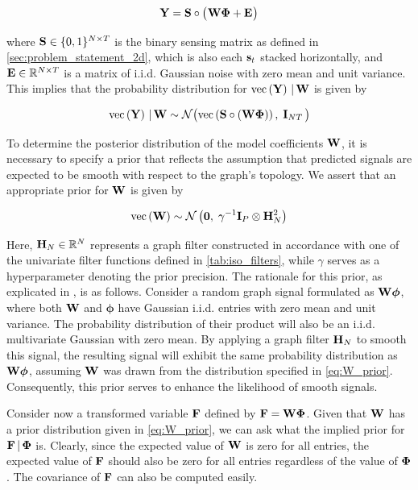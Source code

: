 \begin{equation}
    \mathbf{Y} = \mathbf{S} \circ \big( \mspace{1mu} \mathbf{W} \mathbf{\Phi} + \mathbf{E} \mspace{1mu} \big)
\end{equation}

where $\mathbf{S} \in \{0, 1\}^{N \times T}$ is the binary sensing matrix as defined in \cref{sec:problem_statement_2d}, which is also each $\mathbf{s}_t$ stacked horizontally, and $\mathbf{E} \in \mathbb{R}^{N \times T}$ is a matrix of i.i.d. Gaussian noise with zero mean and unit variance. This implies that the probability distribution for $\text{\textup{vec}}\left(\mathbf{Y}\right) \, | \, \mathbf{W}$ is given by 

\begin{equation}
    \text{\textup{vec}}\left(\mathbf{Y}\right) \, | \, \mathbf{W} \sim \mathcal{N}\big( \text{\textup{vec}}\left(\mathbf{S} \circ (\mathbf{W} \mathbf{\Phi})\right), \; \mathbf{I}_{NT} \, \big)
\end{equation}

To determine the posterior distribution of the model coefficients $\mathbf{W}$, it is necessary to specify a prior that reflects the assumption that predicted signals are expected to be smooth with respect to the graph's topology. We assert that an appropriate prior for $\mathbf{W}$ is given by

\begin{equation}
\label{eq:W_prior}
\text{\textup{vec}}\left(\mathbf{W}\right) \sim \mathcal{N}\left(\mathbf{0}, \; \gamma^{-1} \mathbf{I}_P \otimes \mathbf{H}_N^{2}\right)
\end{equation}

Here, $\mathbf{H}_N \in \mathbb{R}^{N}$ represents a graph filter constructed in accordance with one of the univariate filter functions defined in \cref{tab:iso_filters}, while $\gamma$ serves as a hyperparameter denoting the prior precision. The rationale for this prior, as explicated in \cite{Venkitaraman2020}, is as follows. Consider a random graph signal formulated as $\mathbf{W} \boldsymbol{\phi}$, where both $\mathbf{W}$ and $\boldsymbol{\phi}$ have Gaussian i.i.d. entries with zero mean and unit variance. The probability distribution of their product will also be an i.i.d. multivariate Gaussian with zero mean. By applying a graph filter $\mathbf{H}_N$ to smooth this signal, the resulting signal will exhibit the same probability distribution as $\mathbf{W} \boldsymbol{\phi}$, assuming $\mathbf{W}$ was drawn from the distribution specified in \cref{eq:W_prior}. Consequently, this prior serves to enhance the likelihood of smooth signals.



Consider now a transformed variable $\mathbf{F}$ defined by $\mathbf{F} = \mathbf{W} \mathbf{\Phi}$. Given that $\mathbf{W}$ has a prior distribution given in \cref{eq:W_prior}, we can ask what the implied prior for $\mathbf{F} \, | \, \mathbf{\Phi}$ is. Clearly, since the expected value of $\mathbf{W}$ is zero for all entries, the expected value of $\mathbf{F}$ should also be zero for all entries regardless of the value of $\mathbf{\Phi}$. The covariance of $\mathbf{F}$ can also be computed easily. 

